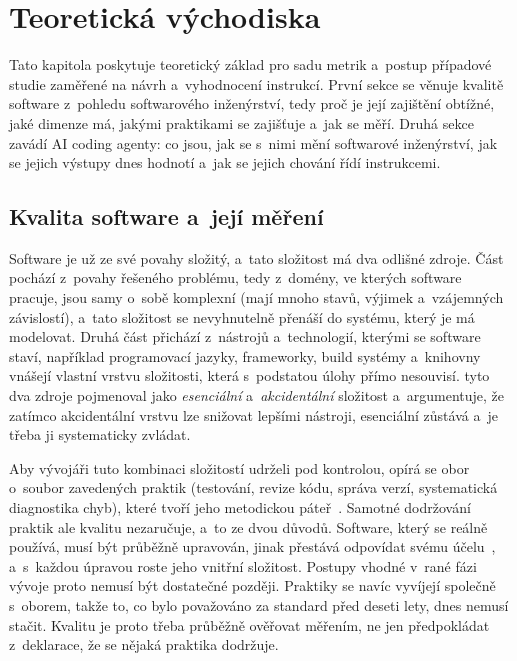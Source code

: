 \chapter{Teoretická východiska}
\label{kap:teorie}

Tato kapitola poskytuje teoretický základ pro sadu metrik
a~postup případové studie zaměřené na návrh a~vyhodnocení instrukcí.
První sekce se věnuje kvalitě
software z~pohledu softwarového inženýrství, tedy proč je její
zajištění obtížné, jaké dimenze má, jakými praktikami se
zajišťuje a~jak se měří. Druhá sekce zavádí AI coding agenty:
co jsou, jak se s~nimi mění softwarové inženýrství, jak se jejich
výstupy dnes hodnotí a~jak se jejich chování řídí instrukcemi.

\section{Kvalita software a~její měření}
\label{sec:swe-zivotni-cyklus}

Software je už ze své povahy složitý, a~tato složitost má dva
odlišné zdroje. Část pochází z~povahy řešeného problému, tedy z~domény,
ve kterých software pracuje, jsou samy o~sobě komplexní (mají mnoho
stavů, výjimek a~vzájemných závislostí), a~tato složitost se
nevyhnutelně přenáší do systému, který je má modelovat. Druhá část
přichází z~nástrojů a~technologií, kterými se software staví, například
programovací jazyky, frameworky, build systémy a~knihovny vnášejí
vlastní vrstvu složitosti, která s~podstatou úlohy přímo nesouvisí.
\textcite{brooks1987} tyto dva zdroje pojmenoval jako
\textit{esenciální} a~\textit{akcidentální} složitost a~argumentuje,
že zatímco akcidentální vrstvu lze snižovat lepšími nástroji,
esenciální zůstává a~je třeba ji systematicky zvládat.

Aby vývojáři tuto kombinaci složitostí udrželi pod kontrolou, opírá se obor
o~soubor zavedených praktik (testování, revize kódu, správa verzí,
systematická diagnostika chyb), které tvoří jeho metodickou
páteř~\cite{swebok2024}. Samotné dodržování praktik
ale kvalitu nezaručuje, a~to ze dvou důvodů. Software, který se
reálně používá, musí být průběžně upravován, jinak přestává
odpovídat svému účelu~\cite{lehman1980}, a~s~každou úpravou roste
jeho vnitřní složitost. Postupy vhodné v~rané fázi vývoje proto
nemusí být dostatečné později. Praktiky se navíc vyvíjejí společně
s~oborem, takže to, co bylo považováno za standard před deseti lety,
dnes nemusí stačit. Kvalitu je proto třeba průběžně ověřovat
měřením, ne jen předpokládat z~deklarace, že se nějaká praktika
dodržuje.


